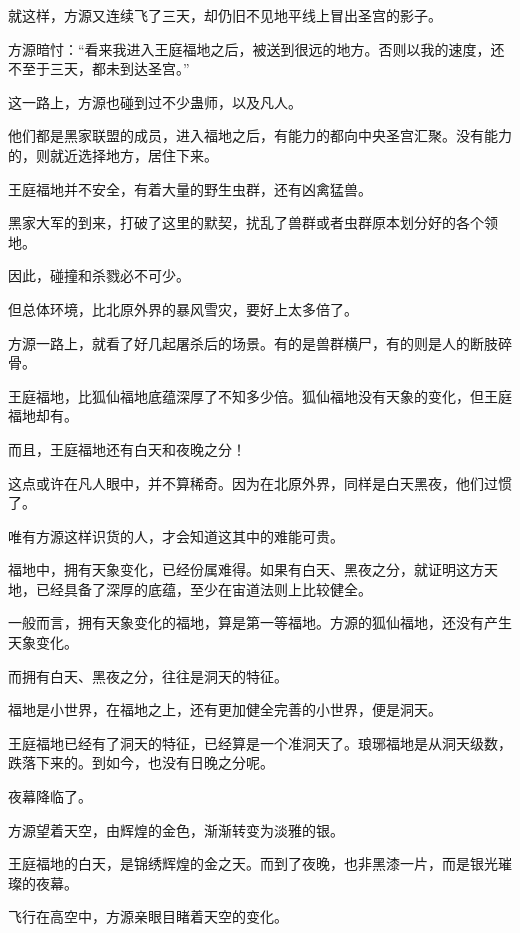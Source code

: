 
\begin{this_body}

就这样，方源又连续飞了三天，却仍旧不见地平线上冒出圣宫的影子。

方源暗忖：“看来我进入王庭福地之后，被送到很远的地方。否则以我的速度，还不至于三天，都未到达圣宫。”

这一路上，方源也碰到过不少蛊师，以及凡人。

他们都是黑家联盟的成员，进入福地之后，有能力的都向中央圣宫汇聚。没有能力的，则就近选择地方，居住下来。

王庭福地并不安全，有着大量的野生虫群，还有凶禽猛兽。

黑家大军的到来，打破了这里的默契，扰乱了兽群或者虫群原本划分好的各个领地。

因此，碰撞和杀戮必不可少。

但总体环境，比北原外界的暴风雪灾，要好上太多倍了。

方源一路上，就看了好几起屠杀后的场景。有的是兽群横尸，有的则是人的断肢碎骨。

王庭福地，比狐仙福地底蕴深厚了不知多少倍。狐仙福地没有天象的变化，但王庭福地却有。

而且，王庭福地还有白天和夜晚之分！

这点或许在凡人眼中，并不算稀奇。因为在北原外界，同样是白天黑夜，他们过惯了。

唯有方源这样识货的人，才会知道这其中的难能可贵。

福地中，拥有天象变化，已经份属难得。如果有白天、黑夜之分，就证明这方天地，已经具备了深厚的底蕴，至少在宙道法则上比较健全。

一般而言，拥有天象变化的福地，算是第一等福地。方源的狐仙福地，还没有产生天象变化。

而拥有白天、黑夜之分，往往是洞天的特征。

福地是小世界，在福地之上，还有更加健全完善的小世界，便是洞天。

王庭福地已经有了洞天的特征，已经算是一个准洞天了。琅琊福地是从洞天级数，跌落下来的。到如今，也没有日晚之分呢。

夜幕降临了。

方源望着天空，由辉煌的金色，渐渐转变为淡雅的银。

王庭福地的白天，是锦绣辉煌的金之天。而到了夜晚，也非黑漆一片，而是银光璀璨的夜幕。

飞行在高空中，方源亲眼目睹着天空的变化。


\end{this_body}
